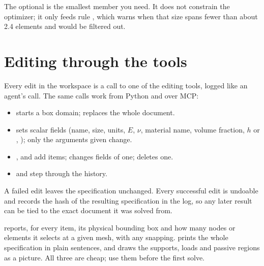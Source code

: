 The optional  is the smallest member you need. It does not constrain the optimizer; it only feeds
rule , which warns when that size spans fewer than about 2.4 elements and would be filtered out.

\section{Editing through the tools}\label{sec:editing}
Every edit in the workspace is a call to one of the editing tools, logged like an agent's call. The same calls work from
Python and over MCP:

\begin{itemize}
  \item {} starts a box domain;  replaces the whole document.
  \item {} sets scalar fields (name, size, units, $E$, $\nu$, material name, volume fraction, $h$ or
  , ); only the arguments given change.
  \item {},  and  add items;  changes fields of one;
   deletes one.
  \item {} and  step through the history.
\end{itemize}

A failed edit leaves the specification unchanged. Every successful edit is undoable and records the hash of the
resulting specification in the log, so any later result can be tied to the exact document it was solved from.

\begin{tipbox}
 reports, for every item, its physical bounding box and how many nodes or elements it selects at a
given mesh, with any snapping.  prints the whole specification in plain sentences, and
 draws the supports, loads and passive regions as a picture. All three are cheap; use them before the
first solve.
\end{tipbox}
